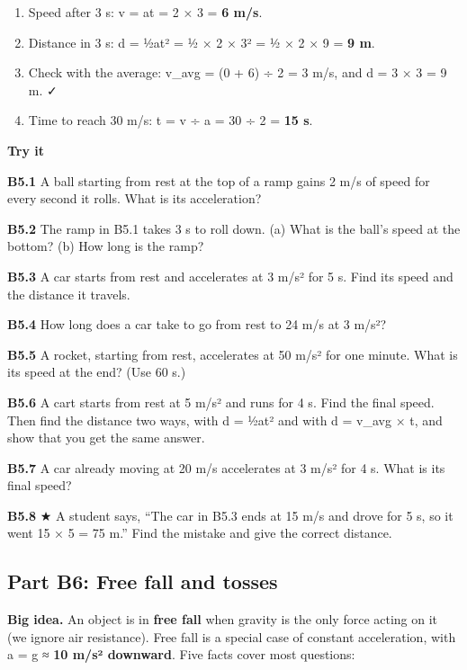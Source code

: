 \documentclass[
]{article}
\providecommand{\tightlist}{%
  \setlength{\itemsep}{0pt}\setlength{\parskip}{0pt}}
\begin{document}
\begin{enumerate}
\def\labelenumi{\arabic{enumi}.}
\tightlist
\item
  Speed after 3 s: v = at = 2 × 3 = \textbf{6 m/s}.
\item
  Distance in 3 s: d = ½at² = ½ × 2 × 3² = ½ × 2 × 9 = \textbf{9 m}.
\item
  Check with the average: v\_avg = (0 + 6) ÷ 2 = 3 m/s, and d = 3 × 3 =
  9 m. ✓
\item
  Time to reach 30 m/s: t = v ÷ a = 30 ÷ 2 = \textbf{15 s}.
\end{enumerate}

\textbf{Try it}

\textbf{B5.1} A ball starting from rest at the top of a ramp gains 2 m/s
of speed for every second it rolls. What is its acceleration?

\textbf{B5.2} The ramp in B5.1 takes 3 s to roll down. (a) What is the
ball's speed at the bottom? (b) How long is the ramp?

\textbf{B5.3} A car starts from rest and accelerates at 3 m/s² for 5 s.
Find its speed and the distance it travels.

\textbf{B5.4} How long does a car take to go from rest to 24 m/s at 3
m/s²?

\textbf{B5.5} A rocket, starting from rest, accelerates at 50 m/s² for
one minute. What is its speed at the end? (Use 60 s.)

\textbf{B5.6} A cart starts from rest at 5 m/s² and runs for 4 s. Find
the final speed. Then find the distance two ways, with d = ½at² and with
d = v\_avg × t, and show that you get the same answer.

\textbf{B5.7} A car already moving at 20 m/s accelerates at 3 m/s² for 4
s. What is its final speed?

\textbf{B5.8} ★ A student says, ``The car in B5.3 ends at 15 m/s and
drove for 5 s, so it went 15 × 5 = 75 m.'' Find the mistake and give the
correct distance.

\subsection{Part B6: Free fall and
tosses}\label{part-b6-free-fall-and-tosses}

\textbf{Big idea.} An object is in \textbf{free fall} when gravity is
the only force acting on it (we ignore air resistance). Free fall is a
special case of constant acceleration, with a = g ≈ \textbf{10 m/s²
downward}. Five facts cover most questions:
\end{document}
